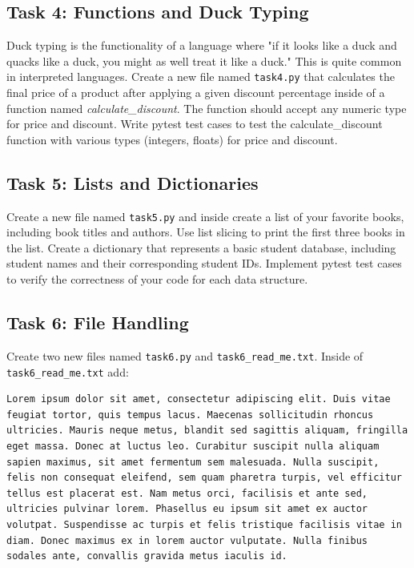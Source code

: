\documentclass{article}
\begin{document}
\subsection{Task 4: Functions and Duck Typing}
Duck typing is the functionality of a language where "if it looks like a duck and quacks like a duck, you might as well treat it like a duck." This is quite common in interpreted languages. Create a new file named \verb|task4.py| that calculates the final price of a product after applying a given discount percentage inside of a function named \textit{calculate\_discount}. The function should accept any numeric type for price and discount. Write pytest test cases to test the calculate\_discount function with various types (integers, floats) for price and discount.

\subsection{Task 5: Lists and Dictionaries}
Create a new file named \verb|task5.py| and inside create a list of your favorite books, including book titles and authors. Use list slicing to print the first three books in the list. Create a dictionary that represents a basic student database, including student names and their corresponding student IDs. Implement pytest test cases to verify the correctness of your code for each data structure.


\subsection{Task 6: File Handling}
Create two new files named \verb|task6.py| and \verb|task6_read_me.txt|. Inside of \verb|task6_read_me.txt| add:
\begin{center} %
\begin{lstlisting}[style=customcode]
Lorem ipsum dolor sit amet, consectetur adipiscing elit. Duis vitae feugiat tortor, quis tempus lacus. Maecenas sollicitudin rhoncus ultricies. Mauris neque metus, blandit sed sagittis aliquam, fringilla eget massa. Donec at luctus leo. Curabitur suscipit nulla aliquam sapien maximus, sit amet fermentum sem malesuada. Nulla suscipit, felis non consequat eleifend, sem quam pharetra turpis, vel efficitur tellus est placerat est. Nam metus orci, facilisis et ante sed, ultricies pulvinar lorem. Phasellus eu ipsum sit amet ex auctor volutpat. Suspendisse ac turpis et felis tristique facilisis vitae in diam. Donec maximus ex in lorem auctor vulputate. Nulla finibus sodales ante, convallis gravida metus iaculis id.
\end{lstlisting}
\end{center}
\end{document}

